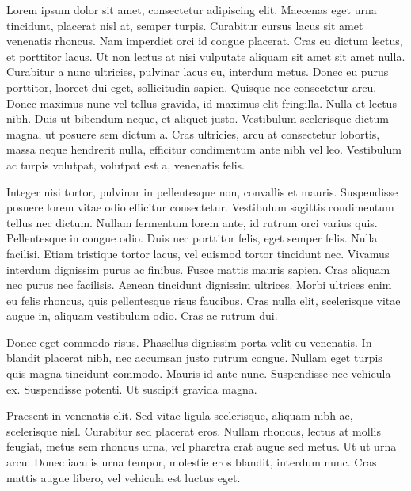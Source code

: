  Lorem ipsum dolor sit amet, consectetur adipiscing elit. Maecenas eget urna tincidunt, placerat nisl at, semper turpis. Curabitur cursus lacus sit amet venenatis rhoncus. Nam imperdiet orci id congue placerat. Cras eu dictum lectus, et porttitor lacus. Ut non lectus at nisi vulputate aliquam sit amet sit amet nulla. Curabitur a nunc ultricies, pulvinar lacus eu, interdum metus. Donec eu purus porttitor, laoreet dui eget, sollicitudin sapien. Quisque nec consectetur arcu. Donec maximus nunc vel tellus gravida, id maximus elit fringilla. Nulla et lectus nibh. Duis ut bibendum neque, et aliquet justo. Vestibulum scelerisque dictum magna, ut posuere sem dictum a. Cras ultricies, arcu at consectetur lobortis, massa neque hendrerit nulla, efficitur condimentum ante nibh vel leo. Vestibulum ac turpis volutpat, volutpat est a, venenatis felis.

Integer nisi tortor, pulvinar in pellentesque non, convallis et mauris. Suspendisse posuere lorem vitae odio efficitur consectetur. Vestibulum sagittis condimentum tellus nec dictum. Nullam fermentum lorem ante, id rutrum orci varius quis. Pellentesque in congue odio. Duis nec porttitor felis, eget semper felis. Nulla facilisi. Etiam tristique tortor lacus, vel euismod tortor tincidunt nec. Vivamus interdum dignissim purus ac finibus. Fusce mattis mauris sapien. Cras aliquam nec purus nec facilisis. Aenean tincidunt dignissim ultrices. Morbi ultrices enim eu felis rhoncus, quis pellentesque risus faucibus. Cras nulla elit, scelerisque vitae augue in, aliquam vestibulum odio. Cras ac rutrum dui.

Donec eget commodo risus. Phasellus dignissim porta velit eu venenatis. In blandit placerat nibh, nec accumsan justo rutrum congue. Nullam eget turpis quis magna tincidunt commodo. Mauris id ante nunc. Suspendisse nec vehicula ex. Suspendisse potenti. Ut suscipit gravida magna.

Praesent in venenatis elit. Sed vitae ligula scelerisque, aliquam nibh ac, scelerisque nisl. Curabitur sed placerat eros. Nullam rhoncus, lectus at mollis feugiat, metus sem rhoncus urna, vel pharetra erat augue sed metus. Ut ut urna arcu. Donec iaculis urna tempor, molestie eros blandit, interdum nunc. Cras mattis augue libero, vel vehicula est luctus eget.


